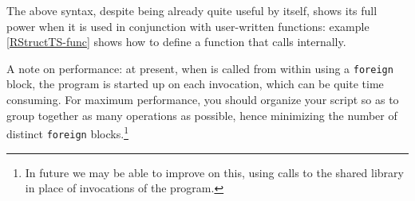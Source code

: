 The above syntax, despite being already quite useful by itself, shows
its full power when it is used in conjunction with user-written
functions: example \ref{RStructTS-func} shows how to define a
 function that calls  internally.

A note on performance: at present, when  is called from within
 using a \texttt{foreign} block, the  program is
started up on each invocation, which can be quite time consuming.  For
maximum performance, you should organize your script so as to group
together as many  operations as possible, hence minimizing the
number of distinct \texttt{foreign} blocks.\footnote{In future we may
  be able to improve on this, using calls to the  shared
  library in place of invocations of the program.}



